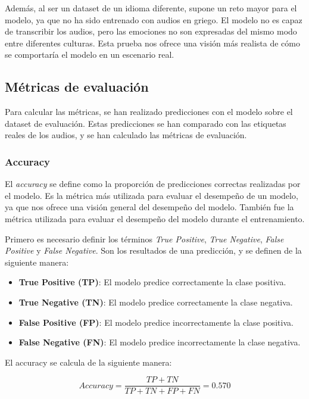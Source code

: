 Además, al ser un dataset de un idioma diferente, supone un reto mayor para el modelo, ya que no ha sido entrenado con audios en griego.
El modelo no es capaz de transcribir los audios, pero las emociones no son expresadas del mismo modo entre diferentes culturas.
Esta prueba nos ofrece una visión más realista de cómo se comportaría el modelo en un escenario real.

\subsection{Métricas de evaluación}\label{seccion:metricas-de-evaluacion}
Para calcular las métricas, se han realizado predicciones con el modelo sobre el dataset de evaluación.
Estas predicciones se han comparado con las etiquetas reales de los audios, y se han calculado las métricas de evaluación.

\subsubsection{Accuracy}\label{seccion:accuracy}
El \textit{accuracy} se define como la proporción de predicciones correctas realizadas por el modelo.
Es la métrica más utilizada para evaluar el desempeño de un modelo, ya que nos ofrece una visión general del desempeño del modelo.
También fue la métrica utilizada para evaluar el desempeño del modelo durante el entrenamiento.

Primero es necesario definir los términos \textit{True Positive}, \textit{True Negative}, \textit{False Positive} y \textit{False Negative}.
Son los resultados de una predicción, y se definen de la siguiente manera:
\begin{itemize}
    \item \textbf{True Positive (TP)}: El modelo predice correctamente la clase positiva.
    \item \textbf{True Negative (TN)}: El modelo predice correctamente la clase negativa.
    \item \textbf{False Positive (FP)}: El modelo predice incorrectamente la clase positiva.
    \item \textbf{False Negative (FN)}: El modelo predice incorrectamente la clase negativa.
\end{itemize}

El accuracy se calcula de la siguiente manera:

\begin{equation}
    Accuracy = \frac{TP + TN}{TP + TN + FP + FN} = 0.570
\end{equation}

